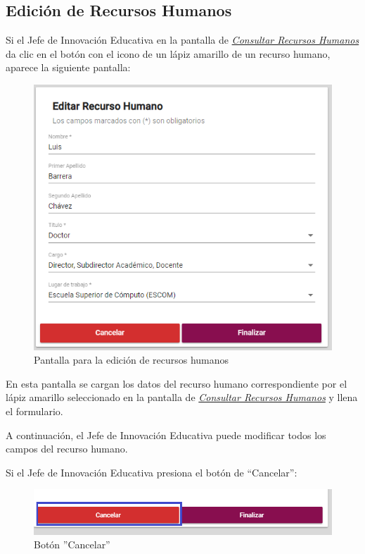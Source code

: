             \subsection{Edición de Recursos Humanos}
                Si el Jefe de Innovación Educativa en la pantalla de \hyperlink{consultarRH}{\textit{Consultar Recursos Humanos}} da clic en el botón con el icono de un lápiz amarillo de un recurso humano, aparece la siguiente pantalla:

                \begin{figure}[H]
                    \centering
                    \hypertarget{editarUs}{\includegraphics[width=0.6\linewidth]{images/SP1/EditarRH}}
                    \caption{Pantalla para la edición de recursos humanos}
                    \label{editarrh}
                \end{figure}

                En esta pantalla se cargan los datos del recurso humano correspondiente por el lápiz amarillo seleccionado en la pantalla de \hyperlink{consultarRH}{\textit{Consultar Recursos Humanos}} y llena el formulario.

                A continuación, el Jefe de Innovación Educativa puede modificar todos los campos del recurso humano.

                Si el Jefe de Innovación Educativa presiona el botón de “Cancelar”:

                \begin{figure}[H]
                    \centering
                    \hypertarget{cancel2}{\includegraphics[width=0.7\linewidth]{images/SP1/BtnCancelar2}}
                    \caption{Botón ''Cancelar''}
                    \label{cancel2}
                \end{figure}

